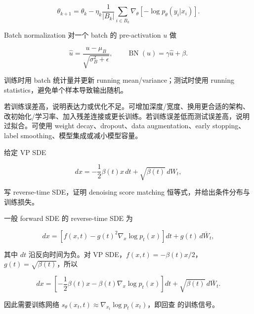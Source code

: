 \[
  \theta_{k+1}
  =
  \theta_k-\eta_k
  \frac{1}{|B_k|}
  \sum_{i\in B_k}
  \nabla_\theta[-\log p_\theta(y_i|x_i)].
\]

Batch normalization 对一个 batch 的 pre-activation \(u\) 做

\[
  \hat u=\frac{u-\mu_B}{\sqrt{\sigma_B^2+\epsilon}},
  \qquad
  \operatorname{BN}(u)=\gamma\hat u+\beta.
\]

训练时用 batch 统计量并更新 running mean/variance；测试时使用 running statistics，避免单个样本导致输出随机。

若训练误差高，说明表达力或优化不足。可增加深度/宽度、换用更合适的架构、改初始化/学习率、加入残差连接或更长训练。若训练误差低而测试误差高，说明过拟合。可使用 weight decay、dropout、data augmentation、early stopping、label smoothing、模型集成或减小模型容量。

\begin{examproblem}
给定 VP SDE

\[
  dx=-\frac12\beta(t)x\,dt+\sqrt{\beta(t)}\,dW_t,
\]

写 reverse-time SDE，证明 denoising score matching 恒等式，并给出条件分布与训练损失。
\end{examproblem}

\solution
一般 forward SDE 的 reverse-time SDE 为

\[
  dx=
  \left[
    f(x,t)-g(t)^2\nabla_x\log p_t(x)
  \right]dt
  +
  g(t)\,d\bar W_t,
\]

其中 \(dt\) 沿反向时间为负。对 VP SDE，\(f(x,t)=-\beta(t)x/2\)，\(g(t)=\sqrt{\beta(t)}\)，所以

\[
  dx=
  \left[
    -\frac12\beta(t)x-\beta(t)\nabla_x\log p_t(x)
  \right]dt
  +
  \sqrt{\beta(t)}\,d\bar W_t.
\]

因此需要训练网络 \(s_\theta(x_t,t)\approx \nabla_{x_t}\log p_t(x_t)\)，即回查  的训练信号。

